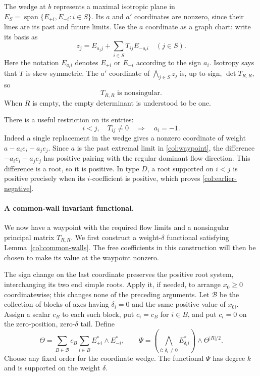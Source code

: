 The wedge at $b$ represents a maximal isotropic plane in
$E_S=\operatorname{span}\{E_{+i},E_{-i}:i\in S\}$.
Its $a$ and $a'$ coordinates are nonzero, since their lines are its
past and future limits.  Use the $a$ coordinate as a graph chart:
write its basis as
\[
 z_j=E_{a_j j}+\sum_{i\in S}T_{ij}E_{-a_i i}\quad(j\in S).
\]
Here the notation $E_{a_i i}$ denotes $E_{+i}$ or $E_{-i}$ according
to the sign $a_i$.  Isotropy says that $T$ is skew-symmetric.  The
$a'$ coordinate of $\bigwedge_{j\in S}z_j$ is, up to sign,
$\det T_{R,R}$, so
\begin{equation}\label{col:invertible-principal}
 T_{R,R}\text{ is nonsingular}.
\end{equation}
When $R$ is empty, the empty determinant is understood to be one.

There is a useful restriction on its entries:
\begin{equation}\label{col:earlier-negative}
 i<j,\quad T_{ij}\ne0\quad\Longrightarrow\quad a_i=-1.
\end{equation}
Indeed a single replacement in the wedge gives a nonzero coordinate
of weight $a-a_i e_i-a_j e_j$.  Since $a$ is the past extremal
limit in \eqref{col:waypoint}, the difference
$-a_i e_i-a_j e_j$ has positive pairing with the regular dominant
flow direction.  This difference is a root, so it is positive.
In type $D$, a root supported on
$i<j$ is positive precisely when its $i$-coefficient is positive,
which proves \eqref{col:earlier-negative}.

\paragraph{A common-wall invariant functional.}
We now have a waypoint with the required flow limits and a
nonsingular principal matrix $T_{R,R}$.  We first construct a
weight-$\delta$ functional satisfying Lemma~\ref{col:common-walls}.
The free coefficients in this construction will then be chosen to
make its value at the waypoint nonzero.

The sign change on the last coordinate preserves the positive root
system, interchanging its two end simple roots.  Apply it, if needed,
to arrange $x_0\ge0$ coordinatewise; this changes none of the
preceding arguments.  Let $\mathcal B$ be the collection of blocks
of axes having $\delta_i=0$ and the same positive value of $x_{0i}$.
Assign a scalar $c_B$ to each such block, put $c_i=c_B$ for $i\in B$,
and put $c_i=0$ on the zero-position, zero-$\delta$ tail.  Define
\begin{equation}\label{col:theta}
 \Theta=\sum_{B\in\mathcal B}c_B
       \sum_{i\in B}E_{+i}^*\wedge E_{-i}^*,
 \qquad
 \Psi=\left(\bigwedge_{i:\,\delta_i\ne0}
                  E_{\delta_i i}^*\right)
              \wedge\Theta^{|R|/2}.
\end{equation}
Choose any fixed order for the coordinate wedge.  The functional
$\Psi$ has degree $k$ and is supported on the weight $\delta$.

